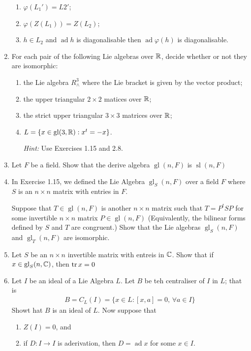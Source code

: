 \documentclass[12pt,a4paper]{report}
\newcommand{\GL}{\operatorname{gl}}
\newcommand{\SL}{\operatorname{sl}}
\newcommand{\AD}{\operatorname{ad}}
\begin{document}
\begin{enumerate}[label=2.\arabic*]
\begin{enumerate}[label=(\alph*)]
	\item $\varphi(L_1') = L2'$;
	
	\item $\varphi(Z(L_1))=Z(L_2)$;
	
	\item $h \in L_2$ and $\AD h$ is diagonalisable then $\AD \varphi(h)$ is diagonalisable.

\end{enumerate}

\item For each pair of the following Lie algebras over $\mathbb{R}$, decide whether or not they are isomorphic:
\begin{enumerate}[label=(\roman*)]

	\item the Lie algebra $R_\wedge^3$ where the Lie bracket is given by the vector product;
	
	\item the upper triangular $2 \times 2$ matices over $\mathbb{R}$;
	
	\item the strict upper triangular $3 \times 3$ matrices over $\mathbb{R}$;
	
	\item $L=\{ x \in \GL(3,\R):x^t=-x\}$.
	
	\textit{Hint:} Use Exercises 1.15 and 2.8.

\end{enumerate}

\item Let $F$ be a field.  Show that the derive algebra $\GL(n,F)$ is $\SL(n,F)$

\item In Exercise 1.15, we defined the Lie Algebra $\GL_S(n,F)$ over a field $F$ where $S$ is an $n\times n$ matrix with entries in $F$.

Suppose that $T \in \GL(n,F)$ is another $n\times n$ matrix such that $T=P^tSP$ for some invertible $n\times n$ matrix $P\in \GL(n,F)$  (Equivalently, the bilinear forms defined by $S$ and $T$ are congruent.)  Show that the Lie algebras $\GL_S(n,F)$ and $\GL_T(n,F)$ are isomorphic.

\item Let $S$ be an $n \times n$ invertible matrix with entreis in $\mathbb{C}$.  Show that if $x \in \GL_S(n,\C)$, then $\operatorname{tr} x=0$

\item Let $I$ be an ideal of a Lie Algebra $L$.  Let $B$ be teh centraliser of $I$ in $L$; that is 
\begin{align*}
	B = C_L(I) = \{x \in L : [x,a]=0, \, \forall a \in I\}
\end{align*}Showt hat $B$ is an ideal of $L$.  Now suppose that
\begin{enumerate}
	\item $Z(I)=0$, and
	\item if $D:I\to I$ is aderivation, then $D=\AD x$ for some $x \in I$.
	

\end{enumerate}
\end{enumerate}
\end{document}
